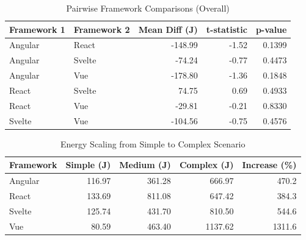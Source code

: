 \begin{table}[htbp]
\centering
\caption{Pairwise Framework Comparisons (Overall)}
\label{tab:pairwise}
\begin{tabular}{llrrr}
\toprule
\textbf{Framework 1} & \textbf{Framework 2} & \textbf{Mean Diff (J)} & \textbf{t-statistic} & \textbf{p-value} \\
\midrule
Angular  & React    & -148.99 &   -1.52 & 0.1399 \\
Angular  & Svelte   &  -74.24 &   -0.77 & 0.4473 \\
Angular  & Vue      & -178.80 &   -1.36 & 0.1848 \\
React    & Svelte   &   74.75 &    0.69 & 0.4933 \\
React    & Vue      &  -29.81 &   -0.21 & 0.8330 \\
Svelte   & Vue      & -104.56 &   -0.75 & 0.4576 \\
\bottomrule
\end{tabular}
\end{table}


\begin{table}[htbp]
\centering
\caption{Energy Scaling from Simple to Complex Scenario}
\label{tab:scaling}
\begin{tabular}{lrrrr}
\toprule
\textbf{Framework} & \textbf{Simple (J)} & \textbf{Medium (J)} & \textbf{Complex (J)} & \textbf{Increase (\%)} \\
\midrule
Angular  &  116.97 &  361.28 &  666.97 &  470.2 \\
React    &  133.69 &  811.08 &  647.42 &  384.3 \\
Svelte   &  125.74 &  431.70 &  810.50 &  544.6 \\
Vue      &   80.59 &  463.40 & 1137.62 & 1311.6 \\
\bottomrule
\end{tabular}
\end{table}

